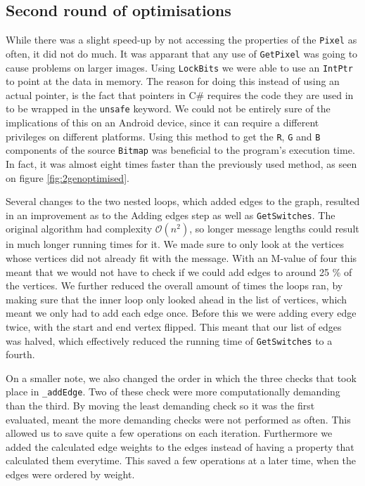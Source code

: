 \subsection{Second round of optimisations}
While there was a slight speed-up by not accessing the properties of the \lstinline|Pixel| as often, it did not do much.
It was apparant that any use of \lstinline|GetPixel| was going to cause problems on larger images.
Using \lstinline|LockBits| we were able to use an \lstinline|IntPtr| to point at the data in memory. \citep{MSDNIntPtr}
The reason for doing this instead of using an actual pointer, is the fact that pointers in C\# requires the code they are used in to be wrapped in the \lstinline|unsafe| keyword. 
We could not be entirely sure of the implications of this on an Android device, since it can require a different privileges on different platforms.
Using this method to get the \lstinline|R|, \lstinline|G| and \lstinline|B| components of the source \lstinline|Bitmap| was beneficial to the program's execution time.
In fact, it was almost eight times faster than the previously used method, as seen on figure \ref{fig:2genoptimised}.

Several changes to the two nested loops, which added edges to the graph, resulted in an improvement as to the Adding edges step as well as \lstinline|GetSwitches|.
The original algorithm had complexity $\mathcal{O}(n^2)$, so longer message lengths could result in much longer running times for it.
We made sure to only look at the vertices whose vertices did not already fit with the message.
With an M-value of four this meant that we would not have to check if we could add edges to around 25 \% of the vertices.
We further reduced the overall amount of times the loops ran, by making sure that the inner loop only looked ahead in the list of vertices, which meant we only had to add each edge once.
Before this we were adding every edge twice, with the start and end vertex flipped.
This meant that our list of edges was halved, which effectively reduced the running time of \lstinline|GetSwitches| to a fourth.

On a smaller note, we also changed the order in which the three checks that took place in \lstinline|_addEdge|.
Two of these check were more computationally demanding than the third.
By moving the least demanding check so it was the first evaluated, meant the more demanding checks were not performed as often.
This allowed us to save quite a few operations on each iteration. 
Furthermore we added the calculated edge weights to the edges instead of having a property that calculated them everytime. 
This saved a few operations at a later time, when the edges were ordered by weight.

